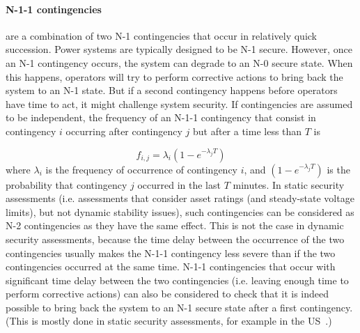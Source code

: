 \paragraph*{N-1-1 contingencies} are a combination of two N-1 contingencies that occur in relatively quick succession. Power systems are typically designed to be N-1 secure. However, once an N-1 contingency occurs, the system can degrade to an N-0 secure state. When this happens, operators will try to perform corrective actions to bring back the system to an N-1 state. But if a second contingency happens before operators have time to act, it might challenge system security. If contingencies are assumed to be independent, the frequency of an N-1-1 contingency that consist in contingency \(i\) occurring after contingency \(j\) but after a time less than \(T\) is

\begin{equation}
\label{eq:N-1-1_frequency}
    f_{i,j} = \lambda_i  (1-e^{-\lambda_j T})
\end{equation}
\noindent where \(\lambda_i\) is the frequency of occurrence of contingency \(i\), and \((1-e^{-\lambda_j T})\) is the probability that contingency \(j\) occurred in the last \(T\) minutes. In static security assessments (i.e. assessments that consider asset ratings (and steady-state voltage limits), but not dynamic stability issues), such contingencies can be considered as N-2 contingencies as they have the same effect. This is not the case in dynamic security assessments, because the time delay between the occurrence of the two contingencies usually makes the N-1-1 contingency less severe than if the two contingencies occurred at the same time. N-1-1 contingencies that occur with significant time delay between the two contingencies (i.e. leaving enough time to perform corrective actions) can also be considered to check that it is indeed possible to bring back the system to an N-1 secure state after a first contingency. (This is mostly done in static security assessments, for example in the US~\cite{ContingencyTypes}.)

